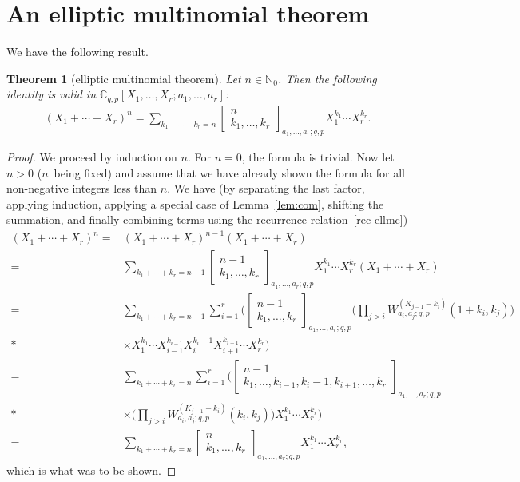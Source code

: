 \documentclass[pdftex]{sigma}
\numberwithin{equation}{section}
\newtheorem{Theorem}{Theorem}[section]
\theoremstyle{definition}
\newcommand{\C}{\mathbb C}
\newcommand{\N}{\mathbb N}
\begin{document}
\section{An elliptic multinomial theorem}\label{sec:ellmthm}
We have the following result.
\begin{Theorem}[elliptic multinomial theorem]\label{ellmthm}
 Let $n\in\N_0$.
 Then the following identity is valid in
$\C_{q,p}[X_1,\dots,X_r;a_1,\dots,a_r]$:
\begin{gather*}%
(X_1+\cdots+X_r)^n=\sum_{k_1+\cdots+k_r=n}
\begin{bmatrix}n\\k_1,\dots,k_r\end{bmatrix}_{a_1,\dots,a_r;q,p}
X_1^{k_1}\cdots X_r^{k_r}.
\end{gather*}
\end{Theorem}
\begin{proof}
We proceed by induction on $n$. For $n=0$, the formula is trivial.
Now let $n>0$ ($n$~being fixed) and assume that we have already
shown the formula for all non-negative integers less than $n$.
We have (by separating the last factor, applying induction,
applying a special case of Lemma~\ref{lem:com}, shifting the summation,
and finally combining terms using the recurrence relation~\eqref{rec-ellmc})
\begin{align*}
(X_1+\cdots+X_r)^n={}&(X_1+\cdots+X_r)^{n-1}(X_1+\cdots+X_r)\\
={}&\sum_{k_1+\cdots+k_r=n-1}
\begin{bmatrix}n-1\\k_1,\dots,k_r\end{bmatrix}_{a_1,\dots,a_r;q,p}
X_1^{k_1}\cdots X_r^{k_r}(X_1+\cdots+X_r)\\
={}&\sum_{k_1+\cdots+k_r=n-1}
\sum_{i=1}^r\bigg(
\begin{bmatrix}n-1\\k_1,\dots,k_r\end{bmatrix}_{a_1,\dots,a_r;q,p}
\bigg(\prod_{j>i}W_{a_i,a_j;q,p}^{(K_{j-1}-k_i)}(1+k_i,k_j)\bigg)\\*
&\times
X_1^{k_1}\cdots X_{i-1}^{k_{i-1}}X_i^{k_i+1}
X_{i+1}^{k_{i+1}}\cdots X_r^{k_r}\bigg)\\
={}&\sum_{k_1+\cdots+k_r=n}
\sum_{i=1}^r\bigg(
\begin{bmatrix}n-1\\k_1,\dots,k_{i-1},k_i-1,k_{i+1},\dots,k_r\end{bmatrix}_{a_1,\dots,a_r;q,p}\\*
&\times
\bigg(\prod_{j>i}W_{a_i,a_j;q,p}^{(K_{j-1}-k_i)}(k_i,k_j)\bigg)
X_1^{k_1}\cdots X_r^{k_r}\bigg)\\
={}&\sum_{k_1+\cdots+k_r=n}
\begin{bmatrix}n\\k_1,\dots,k_r\end{bmatrix}_{a_1,\dots,a_r;q,p}
X_1^{k_1}\cdots X_r^{k_r},
\end{align*}
which is what was to be shown.
\end{proof}
\end{document}
